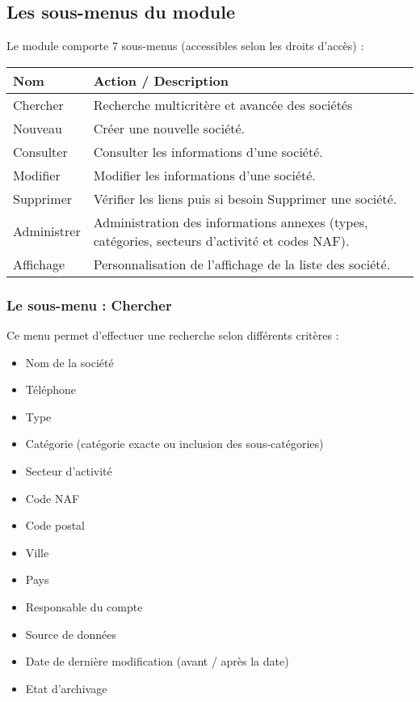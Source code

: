 \subsection{Les sous-menus du module \company}

Le module \company comporte 7 sous-menus (accessibles selon les droits d'accès) :\\

\begin{tabular}{|p{2.5cm}|p{9.5cm}|}
\hline
\textbf{Nom} & \textbf{Action / Description} \\
\hline
Chercher & Recherche multicritère et avancée des sociétés \\
\hline
Nouveau & Créer une nouvelle société.\\
\hline
Consulter & Consulter les informations d'une société.\\
\hline
Modifier & Modifier les informations d'une société.\\
\hline
Supprimer & Vérifier les liens puis si besoin Supprimer une société.\\
\hline
Administrer & Administration des informations annexes (types, catégories, secteurs d'activité et codes NAF).\\
\hline
Affichage & Personnalisation de l'affichage de la liste des société.\\
\hline
\end{tabular}


\subsubsection{Le sous-menu : Chercher}

Ce menu permet d'effectuer une recherche selon différents critères :

\begin{itemize}
\item Nom de la société
\item Téléphone
\item Type
\item Catégorie (catégorie exacte ou inclusion des sous-catégories)
\item Secteur d'activité
\item Code NAF
\item Code postal
\item Ville
\item Pays
\item Responsable du compte
\item Source de données
\item Date de dernière modification (avant / après la date)
\item Etat d'archivage
\end{itemize}

